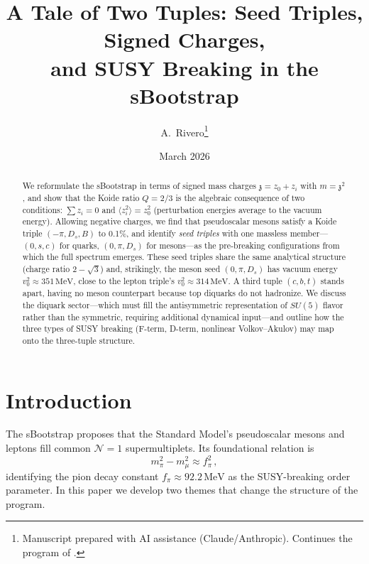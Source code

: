 \documentclass[12pt,a4paper]{article}
\title{A Tale of Two Tuples: Seed Triples, Signed Charges, \\
and SUSY Breaking in the sBootstrap}
\author{A.~Rivero\thanks{Manuscript prepared with AI assistance (Claude/Anthropic). 
Continues the program of \cite{Rivero2005,Rivero2012}.}}
\date{March 2026}
\newcommand{\MeV}{\,\text{MeV}}
\newcommand{\zch}{\mathfrak{z}}
\begin{document}
\maketitle

\begin{abstract}
We reformulate the sBootstrap in terms of signed mass charges 
$\zch = z_0 + z_i$ with $m = \zch^2$, and show that the Koide ratio 
$Q = 2/3$ is the algebraic consequence of two conditions: 
$\sum z_i = 0$ and $\langle z_i^2\rangle = z_0^2$ (perturbation 
energies average to the vacuum energy). Allowing negative charges, 
we find that pseudoscalar mesons satisfy a Koide triple 
$(-\pi, D_s, B)$ to 0.1\%, and identify \emph{seed triples} with 
one massless member---$(0, s, c)$ for quarks, $(0, \pi, D_s)$ for 
mesons---as the pre-breaking configurations from which the full 
spectrum emerges. These seed triples share the same analytical 
structure (charge ratio $2-\sqrt{3}$) and, strikingly, the meson 
seed $(0,\pi,D_s)$ has vacuum energy $v_0^2 \approx 351\MeV$, 
close to the lepton triple's $v_0^2 \approx 314\MeV$. A third 
tuple $(c,b,t)$ stands apart, having no meson counterpart because 
top diquarks do not hadronize. We discuss the diquark sector---which 
must fill the antisymmetric representation of $SU(5)$ flavor rather 
than the symmetric, requiring additional dynamical input---and outline 
how the three types of SUSY breaking (F-term, D-term, nonlinear 
Volkov--Akulov) may map onto the three-tuple structure.
\end{abstract}

\tableofcontents

\section{Introduction}
\label{sec:intro}

The sBootstrap \cite{Rivero2005,Rivero2012} proposes that the Standard 
Model's pseudoscalar mesons and leptons fill common $\mathcal{N}=1$ 
supermultiplets. Its foundational relation is
\begin{equation}
\label{eq:pimu}
m_\pi^2 - m_\mu^2 \approx f_\pi^2\,,
\end{equation}
identifying the pion decay constant $f_\pi \approx 92.2\MeV$ as the 
SUSY-breaking order parameter. In this paper we develop two themes 
that change the structure of the program.
\end{document}
